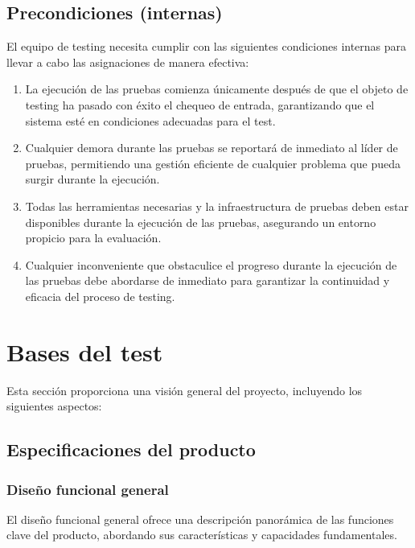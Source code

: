 \documentclass[12pt,a4paper, twoside]{article} %
\begin{document}
\subsection{Precondiciones (internas)}
\label{sec:requisitos-especificos}

El equipo de testing necesita cumplir con las siguientes condiciones internas para llevar a cabo las asignaciones de manera efectiva:

\begin{enumerate}
\item La ejecución de las pruebas comienza únicamente después de que el objeto de testing ha pasado con éxito el chequeo de entrada, garantizando que el sistema esté en condiciones adecuadas para el test.

\item Cualquier demora durante las pruebas se reportará de inmediato al líder de pruebas, permitiendo una gestión eficiente de cualquier problema que pueda surgir durante la ejecución.

\item Todas las herramientas necesarias y la infraestructura de pruebas deben estar disponibles durante la ejecución de las pruebas, asegurando un entorno propicio para la evaluación.

\item Cualquier inconveniente que obstaculice el progreso durante la ejecución de las pruebas debe abordarse de inmediato para garantizar la continuidad y eficacia del proceso de testing.

\end{enumerate}


\section{Bases del test}
\label{sec:orgc1c4017}

Esta sección proporciona una visión general del proyecto, incluyendo los siguientes aspectos:


\subsection{Especificaciones del producto}
\subsubsection{Diseño funcional general} 

El diseño funcional general ofrece una descripción panorámica de las funciones clave del producto, abordando sus características y capacidades fundamentales.
\end{document}
